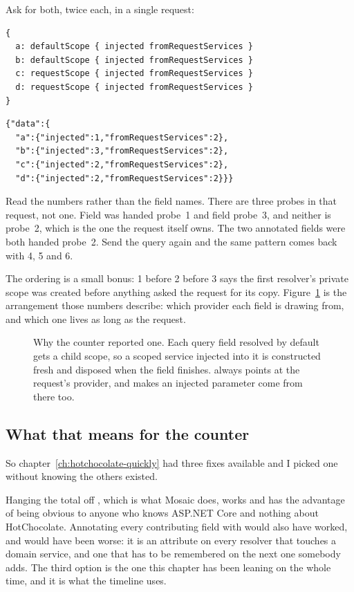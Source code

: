 Ask for both, twice each, in a single request:

\begin{verbatim}
{
  a: defaultScope { injected fromRequestServices }
  b: defaultScope { injected fromRequestServices }
  c: requestScope { injected fromRequestServices }
  d: requestScope { injected fromRequestServices }
}
\end{verbatim}

\begin{verbatim}
{"data":{
  "a":{"injected":1,"fromRequestServices":2},
  "b":{"injected":3,"fromRequestServices":2},
  "c":{"injected":2,"fromRequestServices":2},
  "d":{"injected":2,"fromRequestServices":2}}}
\end{verbatim}

Read the numbers rather than the field names. There are three probes in that
request, not one. Field  was handed probe~1 and field  probe~3,
and neither is probe~2, which is the one the request itself owns. The two
annotated fields were both handed probe~2. Send the query again and the same
pattern comes back with 4, 5 and 6.

The ordering is a small bonus: 1 before 2 before 3 says the first resolver's
private scope was created before anything asked the request for its copy.
Figure~\ref{fig:ch03-scopes} is the arrangement those numbers describe: which
provider each field is drawing from, and which one lives as long as the request.

\begin{figure}[htbp]
  \centering
  
  \caption{Why the counter reported one. Each query field resolved by default
  gets a child scope, so a scoped service injected into it is constructed fresh
  and disposed when the field finishes.  always points at
  the request's provider, and \code{[UseRequestScope]} makes an injected
  parameter come from there too.}
  \label{fig:ch03-scopes}
\end{figure}

\subsection*{What that means for the counter}

%
So chapter~\ref{ch:hotchocolate-quickly} had three fixes available and I picked
one without knowing the others existed.

Hanging the total off , which is what Mosaic does,
works and has the advantage of being obvious to anyone who knows ASP.NET Core
and nothing about HotChocolate. Annotating every contributing field with
\code{[UseRequestScope]} would also have worked, and would have been worse: it
is an attribute on every resolver that touches a domain service, and one that
has to be remembered on the next one somebody adds. The third option is the one
this chapter has been leaning on the whole time, and it is what the timeline
uses.

